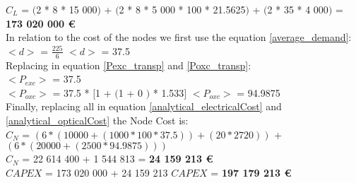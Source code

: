 $C_L$ = $($2 * 8 * 15 000$)$ + $($2 * 8 * 5 000 * 100 * 21.5625$)$ + $($2 * 35 * 4 000$)$ = \textbf{173 020 000 \euro}\\

In relation to the cost of the nodes we first use the equation \ref{average_demand}:\\

$<d>$ = $\frac{225}{6}$ \qquad \qquad $<d>$ = 37.5\\

Replacing in equation \ref{Pexc_transp} and \ref{Poxc_transp}:\\

$<P_{exc}>$ = 37.5\\

$<P_{oxc}>$ = 37.5 * $[$1 + $($1 + $0$ $)$ * 1.533$]$ \qquad \quad $<P_{oxc}>$ = 94.9875 \\

Finally, replacing all in equation \ref{analytical_electricalCost} and \ref{analytical_opticalCost} the Node Cost is:\\

$C_N$ = $\left(6 * (10 000 + (1 000 * 100 * 37.5)) + (20 * 2 720)\right)$ + $\left(6 * (20 000 + (2 500 * 94.9875)) \right)$\\

$C_N$ = 22 614 400 + 1 544 813 = \textbf{24 159 213 \euro}\\

$CAPEX$ = 173 020 000 + 24 159 213 \qquad \qquad $CAPEX$ = \textbf{197 179 213 \euro} 